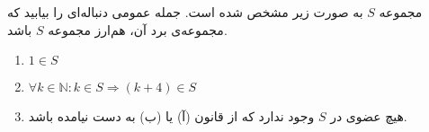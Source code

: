 \begin{PROBLEM}
    \p
    مجموعه
    $S$
    به صورت زیر مشخص شده است. جمله عمومی دنباله‌ای را بیابید که مجموعه‌ی برد آن، هم‌ارز مجموعه $S$ باشد.
    \begin{enumerate}
        \item
        $1 \in S$
            \p
        \item
        $\forall k \in \mathbb{N} : k \in S \Rightarrow (k + 4) \in S$
            \p
        \item
        هیچ عضوی در
        $S$
        وجود ندارد که از قانون (آ) یا (ب) به دست نیامده باشد.
    \end{enumerate}
	
\end{PROBLEM}